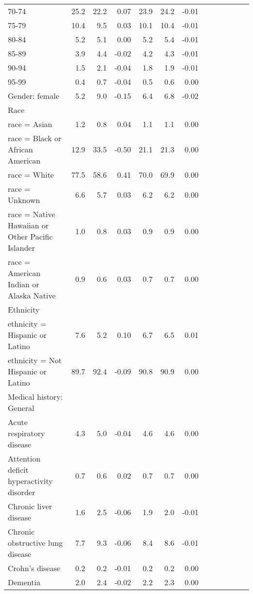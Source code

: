 \documentclass[11pt,]{article}
\begin{document}
\begin{longtable}{lrrrrrrrrrrrr}
      70-74 & 25.2 & 22.2 &  0.07 & 23.9 & 24.2 & -0.01 \\ 
      75-79 & 10.4 &  9.5 &  0.03 & 10.1 & 10.4 & -0.01 \\ 
      80-84 &  5.2 &  5.1 &  0.00 &  5.2 &  5.4 & -0.01 \\ 
      85-89 &  3.9 &  4.4 & -0.02 &  4.2 &  4.3 & -0.01 \\ 
      90-94 &  1.5 &  2.1 & -0.04 &  1.8 &  1.9 & -0.01 \\ 
      95-99 &  0.4 &  0.7 & -0.04 &  0.5 &  0.6 &  0.00 \\ 
  Gender: female &  5.2 &  9.0 & -0.15 &  6.4 &  6.8 & -0.02 \\ 
  Race &    &    &     &    &    &     \\ 
      race = Asian &  1.2 &  0.8 &  0.04 &  1.1 &  1.1 &  0.00 \\ 
      race = Black or African American & 12.9 & 33.5 & -0.50 & 21.1 & 21.3 &  0.00 \\ 
      race = White & 77.5 & 58.6 &  0.41 & 70.0 & 69.9 &  0.00 \\ 
      race = Unknown &  6.6 &  5.7 &  0.03 &  6.2 &  6.2 &  0.00 \\ 
      race = Native Hawaiian or Other Pacific Islander &  1.0 &  0.8 &  0.03 &  0.9 &  0.9 &  0.00 \\ 
      race = American Indian or Alaska Native &  0.9 &  0.6 &  0.03 &  0.7 &  0.7 &  0.00 \\ 
  Ethnicity &    &    &     &    &    &     \\ 
      ethnicity = Hispanic or Latino &  7.6 &  5.2 &  0.10 &  6.7 &  6.5 &  0.01 \\ 
      ethnicity = Not Hispanic or Latino & 89.7 & 92.4 & -0.09 & 90.8 & 90.9 &  0.00 \\ 
  Medical history: General &    &    &     &    &    &     \\ 
      Acute respiratory disease &  4.3 &  5.0 & -0.04 &  4.6 &  4.6 &  0.00 \\ 
      Attention deficit hyperactivity disorder &  0.7 &  0.6 &  0.02 &  0.7 &  0.7 &  0.00 \\ 
      Chronic liver disease &  1.6 &  2.5 & -0.06 &  1.9 &  2.0 & -0.01 \\ 
      Chronic obstructive lung disease &  7.7 &  9.3 & -0.06 &  8.4 &  8.6 & -0.01 \\ 
      Crohn's disease &  0.2 &  0.2 & -0.01 &  0.2 &  0.2 &  0.00 \\ 
      Dementia &  2.0 &  2.4 & -0.02 &  2.2 &  2.3 &  0.00 \\ 

\end{longtable}
\end{document}
